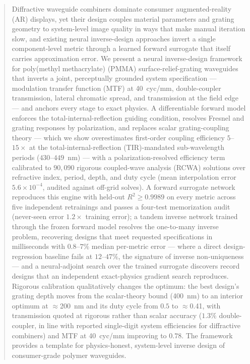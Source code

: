 \begin{abstract}
Diffractive waveguide combiners dominate consumer augmented-reality (AR)
displays, yet their design couples material parameters and grating geometry
to system-level image quality in ways that make manual iteration slow, and
existing neural inverse-design approaches invert a single component-level
metric through a learned forward surrogate that itself carries approximation
error. We present a neural inverse-design framework for poly(methyl
methacrylate) (PMMA) surface-relief-grating waveguides that inverts a joint,
perceptually grounded system specification --- modulation transfer function
(MTF) at 40~cyc/mm, double-coupler transmission, lateral chromatic spread,
and transmission at the field edge --- and anchors every stage to exact
physics. A differentiable forward model enforces the total-internal-reflection
guiding condition, resolves Fresnel and grating responses by polarization,
and replaces scalar grating-coupling theory --- which we show overestimates
first-order coupling efficiency $5$--$15\times$ at the total-internal-reflection
(TIR)-mandated sub-wavelength periods ($430$--$449$~nm) --- with a
polarization-resolved efficiency term calibrated to $90{,}090$ rigorous
coupled-wave analysis (RCWA) solutions over refractive index, period,
depth, and duty cycle (mean interpolation error $5.6\times10^{-4}$,
audited against off-grid solves). A forward surrogate
network reproduces this engine with held-out $R^2 \geq 0.9989$ on every
metric across five independent retrainings and passes a four-test
memorization audit (never-seen error $1.2\times$ training error); a tandem
inverse network trained through the frozen forward model resolves the
one-to-many inverse problem, recovering designs that meet requested
specifications in milliseconds with $0.8$--$7\%$ median per-metric error ---
where a direct design-regression baseline fails at $12$--$47\%$, the
signature of inverse non-uniqueness --- and a neural-adjoint search over the
trained surrogate discovers record designs that an independent
exact-physics gradient search reproduces. Rigorous calibration qualitatively
changes the optimum: the best design's grating depth moves from the
scalar-theory bound (400~nm) to an interior optimum at $\approx$200~nm and
its duty cycle from $0.5$ to $\approx$0.41, with transmission quoted at
rigorous rather than scalar accuracy ($1.3\%$ double-coupler, in line with
reported single-digit system efficiencies for diffractive combiners) and MTF
at 40~cyc/mm improving to $0.78$. The framework provides a template for
physics-honest, system-level inverse design of consumer-grade polymer
waveguides.
\end{abstract}

